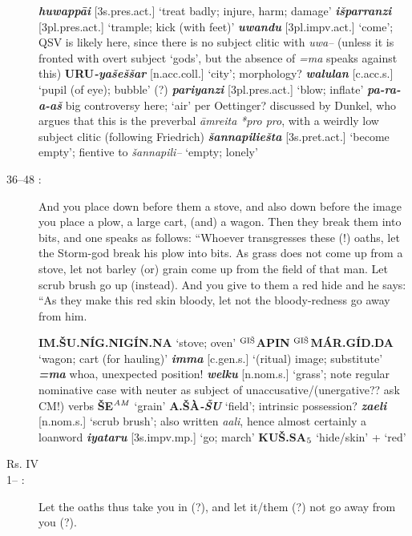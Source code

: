 \documentclass[10pt]{article}
\newcommand{\supersc}[1]{$^{\textrm{\scriptsize{#1}}}$}  	%
\newcommand{\subsc}[1]{$_{\textrm{\scriptsize{#1}}}$}	%
\newcommand{\bit}[1]{\textbf{\textit{#1}}}				%
\newcommand{\p}[1]{{\tiny[{#1}]}}					%
\newcommand{\hith}{\textsubwedge{h}}
\newcommand{\wood}{\supersc{GI\v{S}}}
\renewcommand{\.}[1]{\textsubdot{#1}}
\begin{document}
\begin{description}
\begin{notes}

\bit{huwapp\=ai} \p{3s.pres.act.} `treat badly; injure, harm; damage' \bit{i\v{s}parranzi} \p{3pl.pres.act.} `trample; kick (with feet)' \bit{uwandu} \p{3pl.impv.act.} `come'; QSV  is likely here, since there is no subject clitic with \textit{uwa--} (unless it is fronted with overt subject `gods', but the absence of \textit{=ma} speaks against this) \textbf{URU}\bit{-ya\v{s}e\v{s}\v{s}ar} \p{n.acc.coll.} `city'; morphology? \bit{walulan} \p{c.acc.s.} `pupil (of eye); bubble' (?) \bit{pariyanzi} \p{3pl.pres.act.} `blow; inflate' \bit{pa-ra-a-a\v{s}} big controversy here; `air' per Oettinger? discussed by Dunkel, who argues that this is the preverbal \textit{\=amreita} \textit{*pro pro}, with a weirdly low subject clitic (following Friedrich) \bit{\v{s}annapilie\v{s}ta} \p{3s.pret.act.} `become empty'; fientive to \textit{\v{s}annapili--} `empty; lonely' 

\end{notes}


\item[36--48 :] And you place down before them a stove, and also down before the image you place a plow, a large cart, (and) a wagon. Then they break them into bits, and one speaks as follows: ``Whoever transgresses these (!) oaths, let the Storm-god break his plow into bits. As grass does not come up from a stove, let not barley (or) grain come up from the field of that man. Let scrub brush go up (instead). And you give to them a red hide and he says: ``As they make this red skin bloody, let not the bloody-redness go away from him.


\begin{notes}

\textbf{IM.\v{S}U.N\'IG.NIG\'IN.NA} `stove; oven' \textbf{{\wood}APIN} \textbf{{\wood}M\'AR.G\'ID.DA} `wagon; cart (for hauling)' \bit{{\hith}imma} \p{c.gen.s.} `(ritual) image; substitute' \bit{=ma} whoa, unexpected position! \bit{welku} \p{n.nom.s.} `grass'; note regular nominative case with neuter as subject of unaccusative/(unergative?? ask CM!) verbs \textbf{\v{S}E\supersc{\textit{AM}}} `grain' \textbf{A.\v{S}\`A\textit{-\v{S}U}} `field'; intrinsic possession? \bit{za{\hith\hith}eli} \p{n.nom.s.} `scrub brush'; also written \textit{{\hith}a{\hith\hith}ali}, hence almost certainly a loanword \bit{iyataru} \p{3s.impv.mp.} `go; march' \textbf{KU\v{S}.SA\subsc{5}} `hide/skin' + `red' 

\end{notes}

\bigskip
\item[Rs. IV]
\bigskip

\item[1-- :] Let the oaths thus take you in (?), and let it/them (?) not go away from you (?). 

\begin{notes}


\end{notes}

\end{description}
\end{document}
